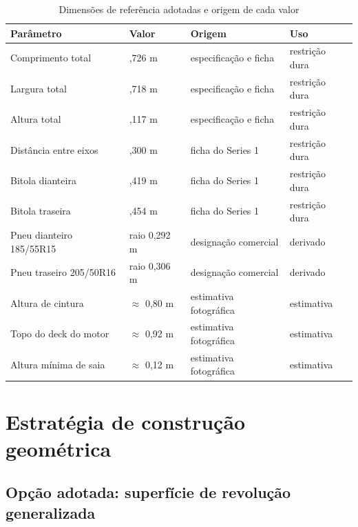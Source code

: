 \begin{table}[htbp]
\centering
\caption{Dimens\~oes de refer\^encia adotadas e origem de cada valor}
\label{tab:dimensoes}
\footnotesize
\begin{tabular}{>{\raggedright\arraybackslash}p{4.6cm}>{\raggedright\arraybackslash}p{2.6cm}>{\raggedright\arraybackslash}p{2.4cm}>{\raggedright\arraybackslash}p{3.4cm}}
\toprule
\textbf{Par\^ametro} & \textbf{Valor} & \textbf{Origem} & \textbf{Uso} \\
\midrule
Comprimento total & 3,726 m & especifica{\c{c}}\~ao e ficha & restri{\c{c}}\~ao dura \\
Largura total & 1,718 m & especifica{\c{c}}\~ao e ficha & restri{\c{c}}\~ao dura \\
Altura total & 1,117 m & especifica{\c{c}}\~ao e ficha & restri{\c{c}}\~ao dura \\
Dist\^ancia entre eixos & 2,300 m & ficha do Series 1 & restri{\c{c}}\~ao dura \\
Bitola dianteira & 1,419 m & ficha do Series 1 & restri{\c{c}}\~ao dura \\
Bitola traseira & 1,454 m & ficha do Series 1 & restri{\c{c}}\~ao dura \\
Pneu dianteiro 185/55R15 & raio 0,292 m & designa{\c{c}}\~ao comercial & derivado \\
Pneu traseiro 205/50R16 & raio 0,306 m & designa{\c{c}}\~ao comercial & derivado \\
Altura de cintura & $\approx$ 0,80 m & estimativa fotogr\'afica & estimativa \\
Topo do deck do motor & $\approx$ 0,92 m & estimativa fotogr\'afica & estimativa \\
Altura m\'inima de saia & $\approx$ 0,12 m & estimativa fotogr\'afica & estimativa \\
\bottomrule
\end{tabular}
\end{table}

\section{Estrat\'egia de constru{\c{c}}\~ao geom\'etrica}

\subsection{Op{\c{c}}\~ao adotada: superf\'icie de revolu{\c{c}}\~ao generalizada}

